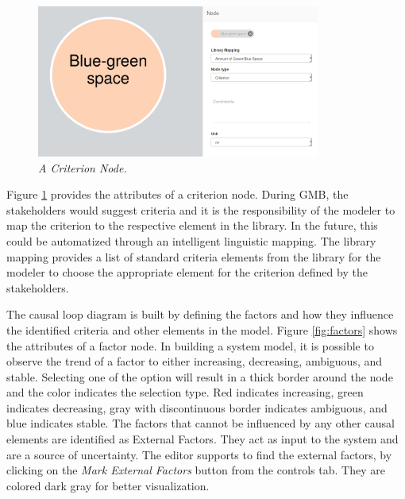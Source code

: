 \documentclass[a4paper]{article}
\begin{document}
\begin{figure}[H]
\begin{center}
\includegraphics[width=0.75\linewidth, height=5cm]{img/criterion.png}
\caption{\small \sl A Criterion Node.\label{fig:criterion}}
\end{center}
\end{figure}

Figure \ref{fig:criterion} provides the attributes of a criterion node. During GMB, the stakeholders would suggest criteria and it is the responsibility of the modeler to map the criterion to the respective element in the library. In the future, this could be automatized through an intelligent linguistic mapping. The library mapping provides a list of standard criteria elements from the library for the modeler to choose the appropriate element for the criterion defined by the stakeholders.

The causal loop diagram is built by defining the factors and how they influence the identified criteria and other elements in the model. Figure \ref{fig:factors} shows the attributes of a factor node. In building a system model, it is possible to observe the trend of a factor to either increasing, decreasing, ambiguous, and stable. Selecting one of the option will result in a thick border around the node and the color indicates the selection type. Red indicates increasing, green indicates decreasing, gray with discontinuous border indicates ambiguous, and blue indicates stable. The factors that cannot be influenced by any other causal elements are identified as External Factors. They act as input to the system and are a source of uncertainty. The editor supports to find the external factors, by clicking on the \textit{Mark External Factors} button from the controls tab. They are colored dark gray for better visualization.
\end{document}
